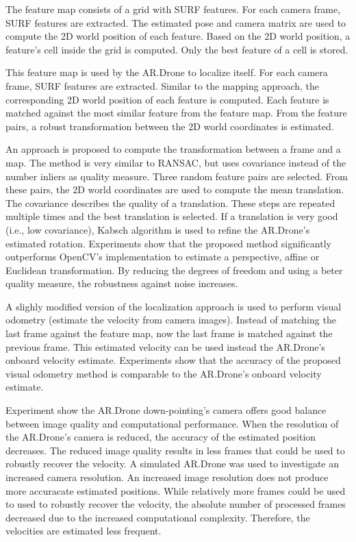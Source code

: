 The feature map consists of a grid with SURF features.
For each camera frame, SURF features are extracted.
The estimated pose and camera matrix are used to compute the 2D world position of each feature.
Based on the 2D world position, a feature's cell inside the grid is computed.
Only the best feature of a cell is stored.

This feature map is used by the AR.Drone to localize itself.
For each camera frame, SURF features are extracted.
Similar to the mapping approach, the corresponding 2D world position of each feature is computed.
Each feature is matched against the most similar feature from the feature map.
From the feature pairs, a robust transformation between the 2D world coordinates is estimated.

An approach is proposed to compute the transformation between a frame and a map.
The method is very similar to RANSAC, but uses covariance instead of the number inliers as quality measure.
Three random feature pairs are selected.
From these pairs, the 2D world coordinates are used to compute the mean translation.
The covariance describes the quality of a translation.
These steps are repeated multiple times and the best translation is selected.
If a translation is very good (i.e., low covariance), Kabsch algorithm is used to refine the AR.Drone's estimated rotation.
Experiments show that the proposed method significantly outperforms OpenCV's implementation to estimate a perspective, affine or Euclidean transformation.
By reducing the degrees of freedom and using a beter quality measure, the robustness against noise increases.

A slighly modified version of the localization approach is used to perform visual odometry (estimate the velocity from camera images).
Instead of matching the last frame against the feature map, now the last frame is matched against the previous frame.
This estimated velocity can be used instead 
 the AR.Drone's onboard velocity estimate.
Experiments show that the accuracy of the proposed visual odometry method is comparable to the AR.Drone's onboard velocity estimate.

Experiment show the AR.Drone down-pointing's camera offers good balance between image quality and computational performance.
When the resolution of the AR.Drone's camera is reduced, the accuracy of the estimated position decreases.
The reduced image quality results in less frames that could be used to robustly recover the velocity.
A simulated AR.Drone was used to investigate an increased camera resolution.
An increased image resolution does not produce more accuracate estimated positions.
While relatively more frames could be used to used to robustly recover the velocity, the absolute number of processed frames decreased due to the increased computational complexity.
Therefore, the velocities are estimated less frequent.

